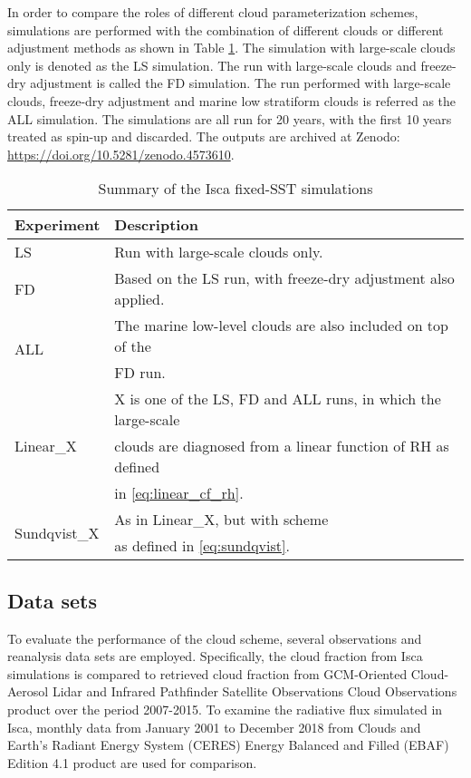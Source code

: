 In order to compare the roles of different cloud parameterization schemes, simulations are performed with the combination of different clouds or different adjustment methods as shown in Table \ref{tab:exps}. The simulation with large-scale clouds only is denoted as the LS simulation. The run with large-scale clouds and freeze-dry adjustment is called the FD simulation. The run performed with large-scale clouds, freeze-dry adjustment and marine low stratiform clouds is referred as the ALL simulation. The simulations are all run for 20 years, with the first 10 years treated as spin-up and discarded. The outputs are archived at Zenodo: \url{https://doi.org/10.5281/zenodo.4573610}.

\begin{table}
	\caption{Summary of the Isca fixed-SST simulations}
	\vspace{0.5em}
	\centering
	\renewcommand{\arraystretch}{1.3}
	\begin{tabular}{ll}
		\toprule
		Experiment & Description \\
		\midrule
		LS  & Run with large-scale clouds only. \\ 
		FD  & Based on the LS run, with freeze-dry adjustment also applied. \\ 
		\multirow{2}{*}{ALL} & The marine low-level clouds are also included on top of the \\
		    & FD run.  \\
		\multirow{3}{*}{Linear\_X} 	&  X is one of the LS, FD and ALL runs, in which the large-scale \\
		& clouds are diagnosed from a linear function of RH as defined\\
		& in \eqref{eq:linear_cf_rh}. \\
		\multirow{2}{*}{Sundqvist\_X} & As in Linear\_X, but with \citet{Sundqvist1989} scheme\\ 
		& as defined in \eqref{eq:sundqvist}.\\
		\bottomrule
	\end{tabular}
	\label{tab:exps}
\end{table}

\subsection{Data sets}
To evaluate the performance of the cloud scheme, several observations and reanalysis data sets are employed. Specifically, the cloud fraction from Isca simulations is compared to retrieved cloud fraction from GCM-Oriented Cloud-Aerosol Lidar and Infrared Pathfinder Satellite Observations Cloud Observations product \citep[CALIPSO-GOCCP hereafter;][]{Chepfer2010} over the period 2007-2015. To examine the radiative flux simulated in Isca, monthly data from January 2001 to December 2018 from Clouds and Earth's Radiant Energy System (CERES)  Energy Balanced and Filled (EBAF) Edition 4.1 product \citep[CERES-EBAF hereafter;][]{Loeb2018} are used for comparison.

